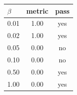 \begin{center}
\begin{tabular}{@{}lcc@{}}
\toprule
$\beta$ & metric & pass \\
\midrule
0.01 & 1.00 & yes \\
0.02 & 1.00 & yes \\
0.05 & 0.00 & no \\
0.10 & 0.00 & no \\
0.50 & 0.00 & yes \\
1.00 & 0.00 & yes \\
\bottomrule
\end{tabular}
\end{center}